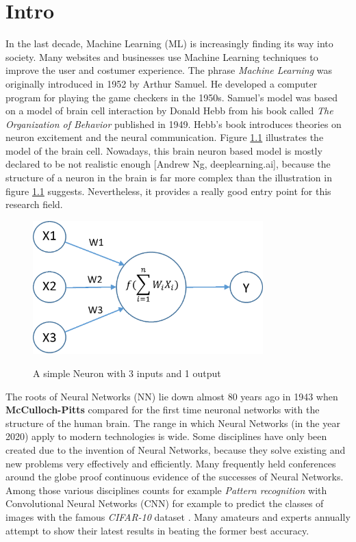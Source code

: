\chapter{Intro}\label{ch:intro}

In the last decade, Machine Learning (ML) is increasingly finding its way into society. Many websites and businesses use Machine Learning techniques to improve the user and costumer experience. The phrase \textit{Machine Learning} was originally introduced in 1952 by Arthur Samuel. He developed a computer program for playing the game checkers in the 1950s. Samuel's model was based on a model of brain cell interaction by Donald Hebb from his book called \textit{The Organization of Behavior} published in 1949. Hebb's book introduces theories on neuron excitement and the neural communication. Figure \ref{neuron} illustrates the model of the brain cell. Nowadays, this brain neuron based model is mostly declared to be not realistic enough [Andrew Ng, deeplearning.ai], because the structure of a neuron in the brain is far more complex than the illustration in figure \ref{neuron} suggests. Nevertheless, it provides a really good entry point for this research field. 

\begin{figure}
  \begin{center}
  \includegraphics[width=3.5in]{photos/neuron}\\
  \caption{A simple Neuron with 3 inputs and 1 output \cite{neuron}}\label{neuron}
  \end{center}
\end{figure}
 
The roots of Neural Networks (NN) lie down almost 80 years ago in 1943 when \textbf{McCulloch-Pitts} \cite{NN} compared for the first time neuronal networks with the structure of the human brain. The range in which Neural Networks (in the year 2020) apply to modern technologies is wide. Some disciplines have only been created due to the invention of Neural Networks, because they solve existing and new problems very effectively and efficiently. Many frequently held conferences around the globe proof continuous evidence of the successes of Neural Networks. Among those various disciplines counts for example \textit{Pattern recognition} with Convolutional Neural Networks (CNN) \cite{cnn} for example to predict the classes of images with the famous \textit{CIFAR-10} dataset \cite{cifar}. Many amateurs \cite{tim} and experts annually attempt to show their latest results in beating the former best accuracy. 

